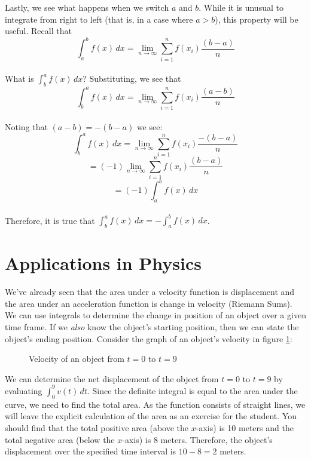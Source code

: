 Lastly, we see what happens when we switch $a$ and $b$. While it is 
unusual to integrate from right to left (that is, in a case where 
$a > b$), this property will be useful. Recall that $$\int_a^b f(x)\,dx 
= \lim_{n \to \infty} \sum_{i = 1}^{n} f(x_i)\frac{(b - a)}{n}$$\\ 
What is $\int_b^a f(x)\,dx$? Substituting, we see that $$\int_b^a f(x)
\,dx =\lim_{n \to \infty} \sum_{i=1}^{n} f(x_i) \frac{(a - b)}{n}$$\\ 
Noting that $(a - b) = -(b - a)$ we see: $$\int_b^a f(x)\,dx = \lim_{n \to 
\infty} \sum_{i = 1}^{n} f(x_i) \frac{-(b - a)}{n}$$ $$=(-1)\lim_{n 
\to \infty} \sum_{i = 1}^{n} f(x_i) \frac{(b - a)}{n}$$ $$=(-1)
\int_a^b f(x)\,dx$$ \\
Therefore, it is true that $\int_b^a f(x)\,dx = -\int_a^b f(x)\,dx$. 

\section{Applications in Physics}
We've already seen that the area under a velocity function is 
displacement and the area under an acceleration function is change in 
velocity (Riemann Sums). We can use integrals to determine the change 
in position of an object over a given time frame. If we \textit{also} 
know the object's starting position, then we can state the object's 
ending position. Consider the graph of an object's velocity in figure 
\ref{fig:velocity}:

\begin{figure}[htbp]
	\caption{Velocity of an object from $t=0$ to $t=9$}
	\label{fig:velocity}
\end{figure}

We can determine the net displacement of the object from $t = 0$ to 
$t = 9$ by evaluating $\int_{0}^{9} v(t)\, dt$. Since the definite 
integral is equal to the area under the curve, we need to find the 
total area. As the function consists of straight lines, we will leave 
the explicit calculation of the area as an exercise for the student. 
You should find that the total positive area (above the $x$-axis) is 
10 meters and the total negative area (below the $x$-axis) is 8 meters. 
Therefore, the object's displacement over the specified time interval 
is $10 - 8 = 2$ meters. 


